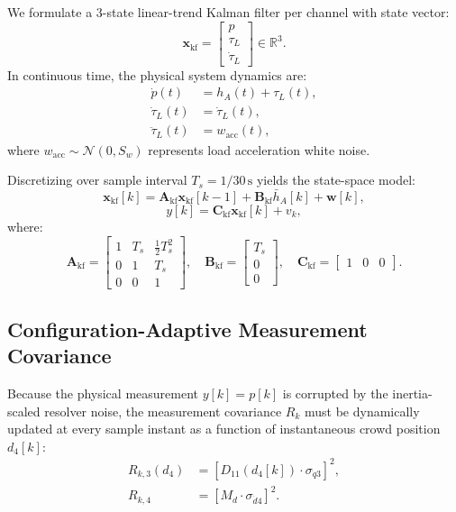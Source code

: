 \documentclass[journal]{IEEEtran}
\begin{document}
We formulate a 3-state linear-trend Kalman filter per channel with state vector:
\begin{equation}
\bm{x}_{\mathrm{kf}} = \begin{bmatrix} p \\ \tau_L \\ \dot{\tau}_L \end{bmatrix} \in \mathbb{R}^3.
\end{equation}
In continuous time, the physical system dynamics are:
\begin{align}
\dot{p}(t) &= h_A(t) + \tau_L(t), \\
\dot{\tau}_L(t) &= \dot{\tau}_L(t), \\
\ddot{\tau}_L(t) &= w_{\mathrm{acc}}(t),
\end{align}
where $w_{\mathrm{acc}} \sim \mathcal{N}(0, S_w)$ represents load acceleration white noise.

Discretizing over sample interval $T_s = 1/30\,\mathrm{s}$ yields the state-space model:
\begin{equation}
\bm{x}_{\mathrm{kf}}[k] = \bm{A}_{\mathrm{kf}} \bm{x}_{\mathrm{kf}}[k-1] + \bm{B}_{\mathrm{kf}} \bar{h}_A[k] + \bm{w}[k],
\end{equation}
\begin{equation}
y[k] = \bm{C}_{\mathrm{kf}} \bm{x}_{\mathrm{kf}}[k] + v_k,
\end{equation}
where:
\begin{equation}
\bm{A}_{\mathrm{kf}} = \begin{bmatrix} 1 & T_s & \frac{1}{2}T_s^2 \\ 0 & 1 & T_s \\ 0 & 0 & 1 \end{bmatrix}, \quad \bm{B}_{\mathrm{kf}} = \begin{bmatrix} T_s \\ 0 \\ 0 \end{bmatrix}, \quad \bm{C}_{\mathrm{kf}} = \begin{bmatrix} 1 & 0 & 0 \end{bmatrix}.
\end{equation}

\subsection{Configuration-Adaptive Measurement Covariance}
Because the physical measurement $y[k] = p[k]$ is corrupted by the inertia-scaled resolver noise, the measurement covariance $R_k$ must be dynamically updated at every sample instant as a function of instantaneous crowd position $d_4[k]$:
\begin{align}
R_{k,3}(d_4) &= \left[D_{11}(d_4[k]) \cdot \sigma_{\dot{q}3}\right]^2, \label{eq:R3} \\
R_{k,4} &= \left[M_d \cdot \sigma_{\dot{d}4}\right]^2. \label{eq:R4}
\end{align}
\end{document}
